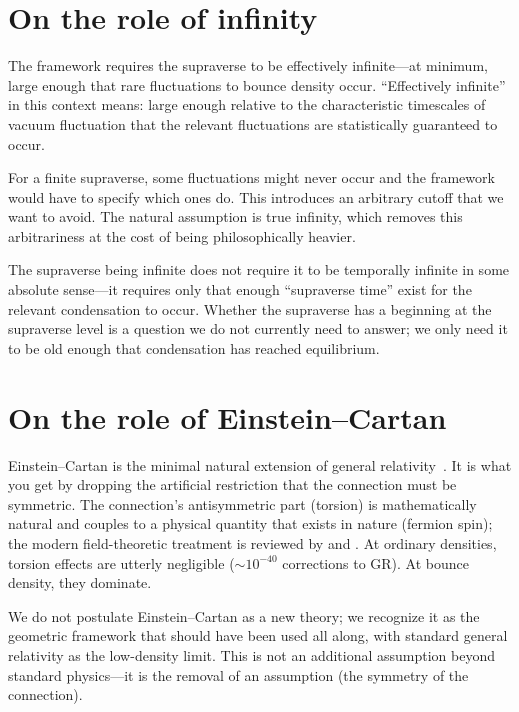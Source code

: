 \section{On the role of infinity}

The framework requires the supraverse to be effectively infinite---at minimum,
large enough that rare fluctuations to bounce density occur. ``Effectively
infinite'' in this context means: large enough relative to the characteristic
timescales of vacuum fluctuation that the relevant fluctuations are
statistically guaranteed to occur.

For a finite supraverse, some fluctuations might never occur and the framework
would have to specify which ones do. This introduces an arbitrary cutoff that we
want to avoid. The natural assumption is true infinity, which removes this
arbitrariness at the cost of being philosophically heavier.

The supraverse being infinite does not require it to be temporally infinite in
some absolute sense---it requires only that enough ``supraverse time'' exist for
the relevant condensation to occur. Whether the supraverse has a beginning at
the supraverse level is a question we do not currently need to answer; we only
need it to be old enough that condensation has reached equilibrium.

\section{On the role of Einstein--Cartan}

Einstein--Cartan is the minimal natural extension of general
relativity~\citep{cartan1922,sciama1964,kibble1961}. It is
what you get by dropping the artificial restriction that the connection must be
symmetric. The connection's antisymmetric part (torsion) is mathematically
natural and couples to a physical quantity that exists in nature (fermion
spin); the modern field-theoretic treatment is reviewed by
\citet{hehl1976} and \citet{trautman2006}.
At ordinary densities, torsion effects are utterly negligible
($\sim 10^{-40}$ corrections to GR). At bounce density, they dominate.

We do not postulate Einstein--Cartan as a new theory; we recognize it as the
geometric framework that should have been used all along, with standard general
relativity as the low-density limit. This is not an additional assumption beyond
standard physics---it is the removal of an assumption (the symmetry of the
connection).

